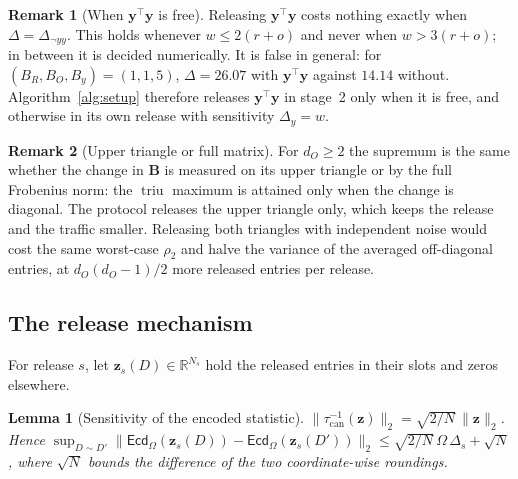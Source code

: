 \documentclass[11pt]{article}
\theoremstyle{definition}
\newtheorem{remark}{Remark}[section]
\theoremstyle{plain}
\newtheorem{lemma}{Lemma}[section]
\newcommand{\R}{\mathbb{R}}
\newcommand{\Ecd}{\mathsf{Ecd}}
\newcommand{\by}{\mathbf{y}}
\newcommand{\bB}{\mathbf{B}}
\DeclareMathOperator{\triu}{triu}
\begin{document}
\begin{remark}[When $\by^\top\by$ is free]
\label{rem:yyfree}
Releasing $\by^\top\by$ costs nothing exactly when $\Delta = \Delta_{\neg yy}$. This holds whenever $w \le 2(r + o)$ and never when $w > 3(r + o)$; in between it is decided numerically. It is false in general: for $(B_R, B_O, B_y) = (1, 1, 5)$, $\Delta = 26.07$ with $\by^\top\by$ against $14.14$ without. Algorithm~\ref{alg:setup} therefore releases $\by^\top\by$ in stage~2 only when it is free, and otherwise in its own release with sensitivity $\Delta_y = w$.
\end{remark}

\begin{remark}[Upper triangle or full matrix]
\label{rem:triu}
For $d_O \ge 2$ the supremum is the same whether the change in $\bB$ is measured on its upper triangle or by the full Frobenius norm: the $\triu$ maximum is attained only when the change is diagonal. The protocol releases the upper triangle only, which keeps the release and the traffic smaller. Releasing both triangles with independent noise would cost the same worst-case $\rho_2$ and halve the variance of the averaged off-diagonal entries, at $d_O(d_O - 1)/2$ more released entries per release.
\end{remark}

\subsection{The release mechanism}
\label{sec:privacy:mech}

For release $s$, let $\mathbf z_s(D) \in \R^{N_s}$ hold the released entries in their slots and zeros elsewhere.

\begin{lemma}[Sensitivity of the encoded statistic]
\label{lem:enc}
$\|\tau_{\mathrm{can}}^{-1}(\mathbf z)\|_2 = \sqrt{2/N}\,\|\mathbf z\|_2$. Hence $\sup_{D \sim D'} \|\Ecd_{\Omega}(\mathbf z_s(D)) - \Ecd_{\Omega}(\mathbf z_s(D'))\|_2 \le \sqrt{2/N}\,\Omega\,\Delta_s + \sqrt N$, where $\sqrt N$ bounds the difference of the two coordinate-wise roundings.
\end{lemma}
\end{document}
